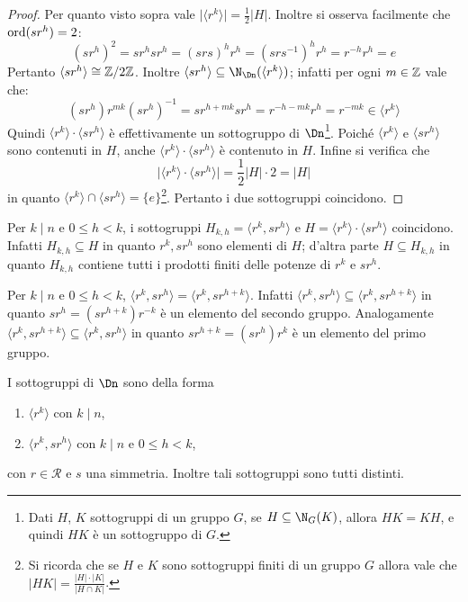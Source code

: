 \documentclass[11pt]{scrartcl}
\begin{document}
	\begin{proof}
		Per quanto visto sopra vale $\lvert \langle r^k\rangle \rvert = 
		\frac 1 2\lvert H\rvert$. Inoltre si osserva facilmente che $\operatorname{ord}(sr^h) = 2$:
		\[
		(sr^h)^2 = sr^hsr^h = (srs)^hr^h = (srs^{-1})^hr^h = r^{-h}r^h = e
		\]
		Pertanto $\langle sr^h\rangle \cong \mathbb{Z}/{2}\mathbb{Z}$. Inoltre $\langle sr^h\rangle
		\subseteq \N_{\Dn}(\langle r^k\rangle)$; infatti per ogni $m \in \mathbb Z$ vale che:
		\[
		(sr^h)r^{mk}(sr^h)^{-1} = sr^{h + mk} sr^h = r^{-h-mk}r^h = r^{-mk}
		\in \langle r^k \rangle
		\]
		Quindi
		$\langle r^k\rangle\cdot\langle sr^h\rangle$ è effettivamente
		un sottogruppo di $\Dn$\footnote
		{Dati $H$, $K$ sottogruppi
			di un gruppo $G$, se $H \subseteq \N_G(K)$,
			allora $HK = KH$, e quindi $HK$ è un sottogruppo di $G$.}.
		Poiché $\langle r^k\rangle$ e $\langle sr^h\rangle$ sono contenuti in $H$,
		anche $\langle r^k\rangle\cdot\langle sr^h\rangle$ è
		contenuto in $H$. Infine si verifica che
		\[\lvert \langle r^k\rangle\cdot\langle sr^h\rangle \rvert = \frac 1 2 \lvert H \rvert \cdot 2 = \lvert H \rvert \]
		in quanto $\langle r^k\rangle\cap\langle sr^h\rangle = \{e\}$\footnote{
			Si ricorda che se $H$ e $K$ sono sottogruppi finiti di un gruppo $G$ allora
			vale che $\lvert HK \rvert = \frac{\lvert H \rvert \cdot \lvert K \rvert}{\lvert H\cap K \rvert}$.
		}. Pertanto 
		i due sottogruppi coincidono.
	\end{proof}
	
	\begin{remark}
		Per $k \mid n$ e $0\leq h < k$, i sottogruppi $H_{k, h} = \langle r^k, sr^h\rangle$
		e $H = \langle r^k\rangle\cdot\langle sr^h\rangle$ coincidono. Infatti 
		$H_{k, h}\subseteq H$ in quanto $r^k, sr^h$ sono elementi di $H$; 
		d'altra parte $H \subseteq H_{k, h}$ in quanto $H_{k, h}$ contiene tutti i 
		prodotti finiti delle potenze di $r^k$ e $sr^h$.
	\end{remark}
	
	\begin{remark}
		Per $k \mid n$ e $0\leq h < k$, $\langle r^k, sr^h\rangle = 
		\langle r^k, sr^{h + k}\rangle$. Infatti $\langle r^k, sr^h\rangle \subseteq
		\langle r^k, sr^{h + k}\rangle$ in quanto $sr^h = (sr^{h + k})r^{-k}$ è
		un elemento del secondo gruppo. Analogamente $\langle r^k, sr^{h + k}\rangle
		\subseteq \langle r^k, sr^h\rangle$ in quanto $sr^{h + k} = (sr^h)r^k$ è un
		elemento del primo gruppo.
	\end{remark}
	
	\begin{theorem}
		I sottogruppi di $\Dn$ sono della forma \begin{enumerate}[(1)]
			\item $\langle r^k\rangle$ con $k\mid n$,
			\item $\langle r^k, sr^h\rangle$ con $k \mid n$ e $0\leq h < k$, 
		\end{enumerate}
		con $r \in \mathcal{R}$ e $s$ una simmetria. Inoltre tali sottogruppi sono
		tutti distinti.
	\end{theorem}
	
\end{document}
